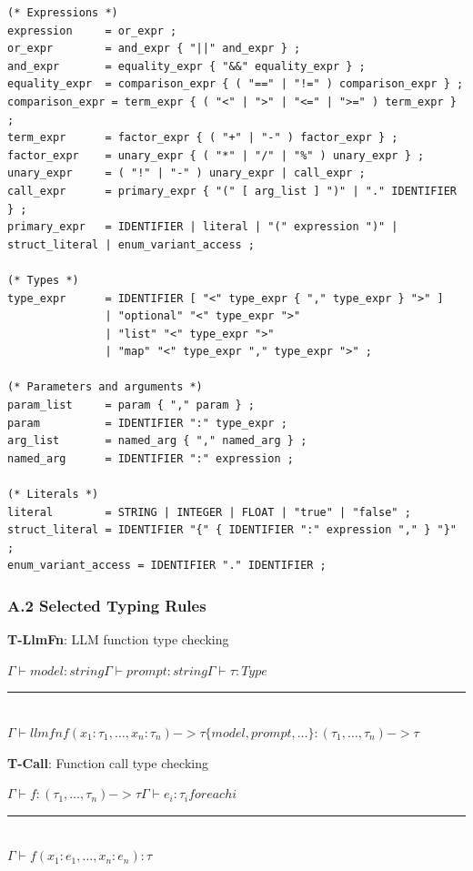 \documentclass[
]{article}
\begin{document}
\begin{lstlisting}
(* Expressions *)
expression     = or_expr ;
or_expr        = and_expr { "||" and_expr } ;
and_expr       = equality_expr { "&&" equality_expr } ;
equality_expr  = comparison_expr { ( "==" | "!=" ) comparison_expr } ;
comparison_expr = term_expr { ( "<" | ">" | "<=" | ">=" ) term_expr } ;
term_expr      = factor_expr { ( "+" | "-" ) factor_expr } ;
factor_expr    = unary_expr { ( "*" | "/" | "%" ) unary_expr } ;
unary_expr     = ( "!" | "-" ) unary_expr | call_expr ;
call_expr      = primary_expr { "(" [ arg_list ] ")" | "." IDENTIFIER } ;
primary_expr   = IDENTIFIER | literal | "(" expression ")" | struct_literal | enum_variant_access ;

(* Types *)
type_expr      = IDENTIFIER [ "<" type_expr { "," type_expr } ">" ]
               | "optional" "<" type_expr ">"
               | "list" "<" type_expr ">"
               | "map" "<" type_expr "," type_expr ">" ;

(* Parameters and arguments *)
param_list     = param { "," param } ;
param          = IDENTIFIER ":" type_expr ;
arg_list       = named_arg { "," named_arg } ;
named_arg      = IDENTIFIER ":" expression ;

(* Literals *)
literal        = STRING | INTEGER | FLOAT | "true" | "false" ;
struct_literal = IDENTIFIER "{" { IDENTIFIER ":" expression "," } "}" ;
enum_variant_access = IDENTIFIER "." IDENTIFIER ;
\end{lstlisting}

\subsubsection{A.2 Selected Typing
Rules}\label{a.2-selected-typing-rules}

\textbf{T-LlmFn}: LLM function type checking

\begin{center}
$ \Gamma  \vdash  model : string    \Gamma  \vdash  prompt : string    \Gamma  \vdash  \tau  : Type $
\\[2pt]
\rule{0.7\linewidth}{0.4pt}
\\[2pt]
$ \Gamma  \vdash  llm fn f(x_1: \tau _1, \ldots , x_n: \tau _n) -> \tau  \{ model, prompt, \ldots  \} : (\tau _1, \ldots , \tau _n) -> \tau  $
\end{center}

\textbf{T-Call}: Function call type checking

\begin{center}
$ \Gamma  \vdash  f : (\tau _1, \ldots , \tau _n) -> \tau     \Gamma  \vdash  e_i : \tau _i  for each i $
\\[2pt]
\rule{0.7\linewidth}{0.4pt}
\\[2pt]
$ \Gamma  \vdash  f(x_1: e_1, \ldots , x_n: e_n) : \tau  $
\end{center}
\end{document}
